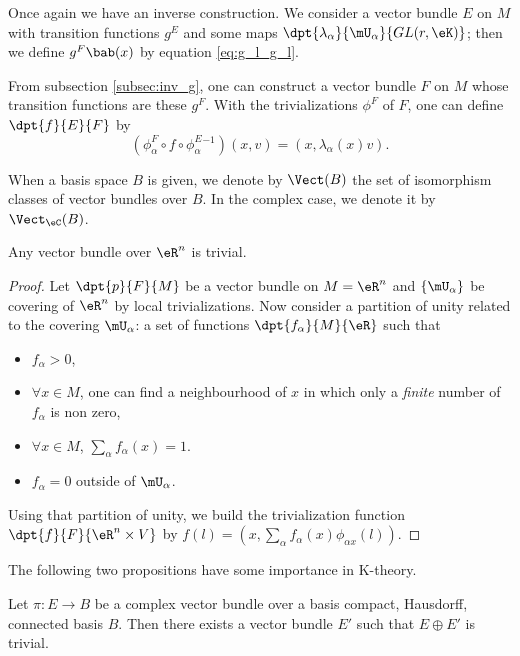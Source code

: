 Once again we have an inverse construction. We consider a vector bundle $E$ on $M$ with transition functions $g^E$ and some maps $\dpt{\lambda_{\alpha}}{\mU_{\alpha}}{GL(r,\eK)}$; then we define $g^F\bab(x)$ by equation \eqref{eq:g_l_g_l}. 

From subsection \ref{subsec:inv_g}, one can construct a vector bundle $F$ on $M$ whose transition functions are these $g^F$. With the trivializations $\phi^F$ of $F$, one can define $\dpt{f}{E}{F}$ by
\[
(\phi^F_{\alpha}\circ f\circ\phi^E_{\alpha}{}^{-1})(x,v)=(x,\lambda_{\alpha}(x)v).
\]

When a basis space $B$ is given, we denote by $\Vect(B)$ the set of isomorphism classes of vector bundles over $B$. In the complex case, we denote it by $\Vect_{\eC}(B)$.

\begin{proposition}
Any vector bundle over $\eR^n$ is trivial.
\end{proposition}

\begin{proof}
Let $\dpt{p}{F}{M}$ be a vector bundle on $M=\eR^n$ and $\{\mU_{\alpha}\}$ be covering of $\eR^n$ by local trivializations. Now consider a partition of unity related to the covering $\mU_{\alpha}$: a set of functions $\dpt{f_{\alpha}}{M}{\eR}$ such that
\begin{itemize}
\item $f_{\alpha}>0$,
\item $\forall x\in M$, one can find a neighbourhood of $x$ in which only a \emph{finite} number of $f_{\alpha}$ is non zero,
\item $\forall x\in M$, $\sum_{\alpha} f_{\alpha}(x)=1$.
\item $f_{\alpha}=0$ outside of $\mU_{\alpha}$.
\end{itemize}
Using that partition of unity, we build the trivialization function $\dpt{f}{F}{\eR^n\times V}$ by $f(l)=(x,\sum_{\alpha} f_{\alpha}(x)\phi_{\alpha x}(l))$.
\end{proof}

The following two propositions have some importance in K-theory.
\begin{proposition}		\label{PropEoplusEprimetriv}
Let $\pi\colon E\to B$ be a complex vector bundle over a basis compact, Hausdorff, connected basis $B$. Then there exists a vector bundle $E'$ such that $E\oplus E'$ is trivial.
\end{proposition}


